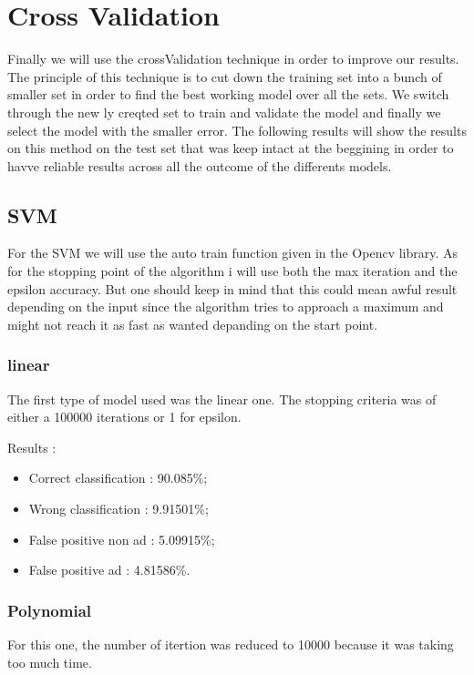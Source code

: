\chapter{Cross Validation}

Finally we will use the crossValidation technique in order to improve our results. The principle of this technique is to cut down the training set into a bunch of smaller set in order to find the best working model over all the sets. We switch through the new ly creqted set to train and validate the model and finally we select the model with the smaller error. The following results will show the results on this method on the test set that was keep intact at the beggining in order to havve reliable results across all the outcome of the differents models.

\section{SVM}

For the SVM we will use the auto train function given in the Opencv library. As for the stopping point of the algorithm i will use both the max iteration and the epsilon accuracy. But one should keep in mind that this could mean awful result depending on the input since the algorithm tries to approach a maximum and might not reach it as fast as wanted depanding on the start point.

\subsection{linear}

The first type of model used was the linear one. The stopping criteria was of either a 100000 iterations or 1 for epsilon.

Results :
\begin{itemize}
  \item Correct classification : 90.085\%;
  \item Wrong classification : 9.91501\%;
  \item False positive non ad : 5.09915\%;
  \item False positive ad : 4.81586\%.
\end{itemize}


\subsection{Polynomial}

For this one, the number of itertion was reduced to 10000 because it was taking too much time.

